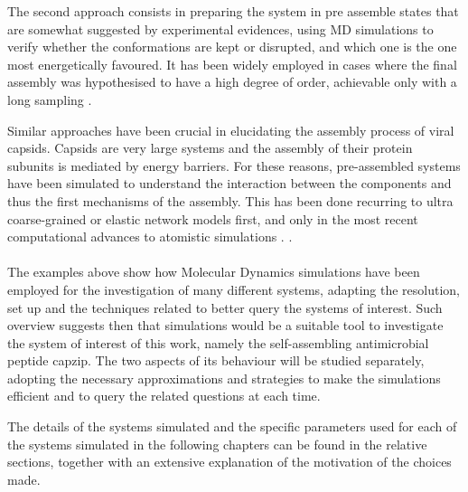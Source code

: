 The second approach consists in preparing the system in pre assemble states that are somewhat suggested by experimental evidences, using MD simulations to verify whether the conformations are kept or disrupted, and which one is the one most energetically favoured. It has been widely employed in cases where the final assembly was hypothesised to have a high degree of order, achievable only with a long sampling \citep{Gudlur2012}.
%

Similar approaches have been crucial in elucidating the assembly process of viral capsids. Capsids are very large systems and the assembly of their protein subunits is mediated by energy barriers. For these reasons, pre-assembled systems have been simulated to understand the interaction between the components and thus the first mechanisms of the assembly. This has been done recurring to ultra coarse-grained or elastic network models \citep{Grime2016,AbiMansour2014} first, and only in the most recent computational advances to atomistic simulations \citep{Perilla2016,Hadden2018}. \citep{AbiMansour2014}.


\paragraph{}
The examples above show how Molecular Dynamics simulations have been employed for the investigation of many different systems, adapting the resolution, set up and the techniques related to better query the systems of interest. Such overview suggests then that simulations would be a suitable tool to investigate the system of interest of this work, namely the self-assembling antimicrobial peptide capzip. The two aspects of its behaviour will be studied separately, adopting the necessary approximations and strategies to make the simulations efficient and to query the related questions at each time.

The details of the systems simulated and the specific parameters used for each of the systems simulated in the following chapters can be found in the relative sections, together with an extensive explanation of the motivation of the choices made.
